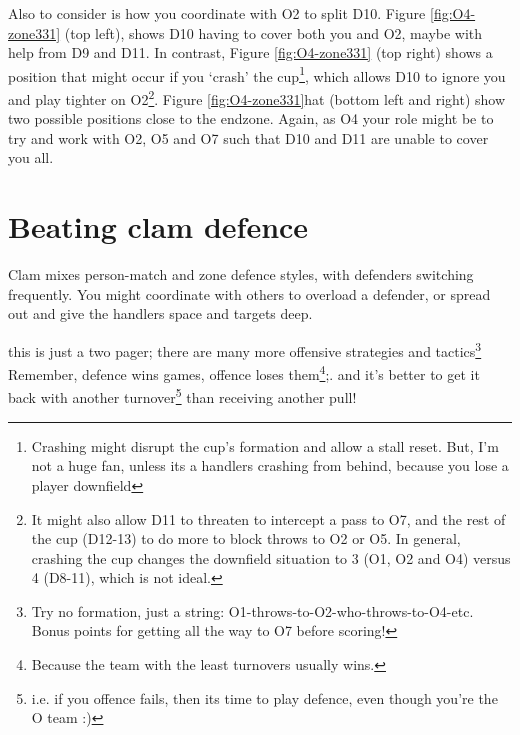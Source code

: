 \documentclass{tufte-handout}
\begin{document}
Also to consider
is how you 
coordinate 
with O2 
to split 
D10. 
Figure \ref{fig:O4-zone331}
(top left), 
shows D10 
having to 
cover both 
you and O2, 
maybe with help 
from D9 
and D11. 
In contrast, 
Figure \ref{fig:O4-zone331}
(top right) 
shows a position 
that might occur 
if you `crash' 
the cup\footnote{ 
Crashing 
might  
disrupt the 
cup's formation and 
allow a stall reset.  
But, I'm not a huge fan, 
unless its a handlers 
crashing from behind, 
because you lose 
a player downfield},
which allows
D10 
to ignore you 
and play 
tighter on O2\footnote{ 
It might also allow 
D11 to threaten to intercept 
a pass to O7, 
and the rest of the cup 
(D12-13) 
to do more 
to block throws 
to O2 or O5. 
In general, 
crashing the cup
changes 
the downfield situation 
to 3 (O1, O2 and O4) 
versus 4 (D8-11), 
which is not ideal.}. 
Figure \ref{fig:O4-zone331}hat
(bottom left and right)
show two possible 
positions close to the 
endzone. 
Again, as O4
your role might 
be to try 
and work with 
O2, O5 and O7 
such that D10 
and D11 are unable to 
cover you all.   


\section{Beating clam defence}\label{sec:zone}
Clam mixes person-match 
and zone defence styles, 
with defenders 
switching frequently.
You might
coordinate 
with others  
to overload 
a defender, 
or spread out 
and give the handlers 
space 
and targets deep. 

this is just a two pager; 
there are many more 
offensive strategies 
and tactics\footnote{
Try no formation, just a string: O1-throws-to-O2-who-throws-to-O4-etc. Bonus points for getting all the way to O7 before scoring!}
Remember, 
defence wins games, 
offence loses them\footnote{
Because the team with the least turnovers 
usually wins.};.
and it's better to get it back 
with another turnover\footnote{
i.e. if you offence fails, then its time to play defence, even though you're the O team :)}
than receiving another pull!
\end{document}
